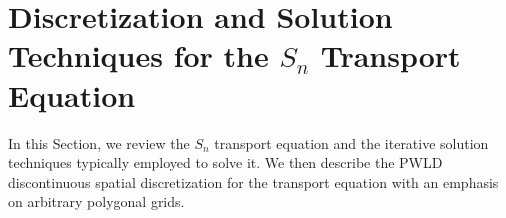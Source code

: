 \documentclass[preprint,10pt]{elsarticle}
\renewcommand{\(}{\left(}
\renewcommand{\)}{\right)}
\renewcommand{\[}{\left[}
\renewcommand{\]}{\right]}
\newcommand{\sn}{\ensuremath{S_n}\xspace}
\begin{document}
\section{Discretization and Solution Techniques for the $S_n$ Transport Equation}\label{sec_transport}

In this Section, we review the \sn transport equation 
and the iterative solution techniques typically
employed to solve it. 
We then describe the PWLD discontinuous spatial
discretization for the transport equation with an emphasis on arbitrary
polygonal grids.

\end{document}
